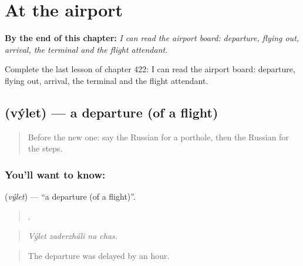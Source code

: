 
\chapter{At the airport}
\label{ch:ru-at-the-airport}

\begin{chapteropening}
\textbf{By the end of this chapter:} \emph{I can read the airport board: departure, flying out, arrival, the terminal and the flight attendant.}

Complete the last lesson of chapter 422: I can read the airport board: departure, flying out, arrival, the terminal and the flight attendant.
\end{chapteropening}

\section[\texorpdfstring{\ru{вылет} (výlet)}{вылет (výlet)}]{ (výlet) — a departure (of a flight)}

\label{lesson:RU-C422-vylet}



\begin{quote}
Before the new one: say the Russian for a porthole, then the Russian for the steps.
\end{quote}

\subsection*{You'll want to know: }
\textbf{} (\emph{výlet}) — \textquotedblleft{}a departure (of a flight)\textquotedblright{}.

\begin{quote}
   .
\end{quote}

\begin{quote}
\emph{Výlet zaderzháli na chas.}
\end{quote}

\begin{quote}
The departure was delayed by an hour.
\end{quote}

